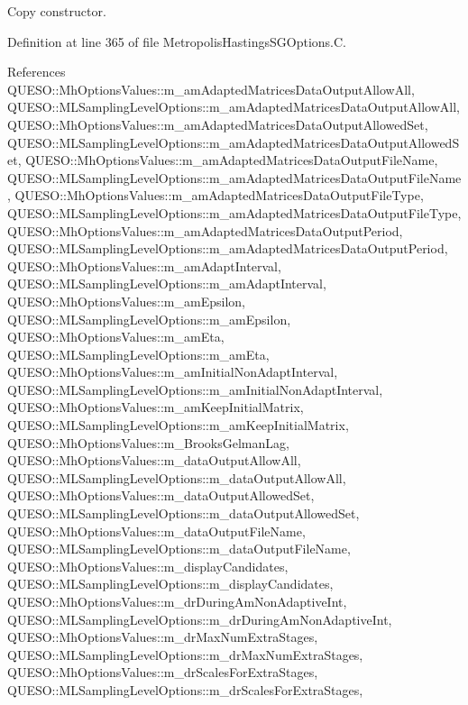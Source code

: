 Copy constructor. 



Definition at line 365 of file Metropolis\-Hastings\-S\-G\-Options.\-C.



References Q\-U\-E\-S\-O\-::\-Mh\-Options\-Values\-::m\-\_\-am\-Adapted\-Matrices\-Data\-Output\-Allow\-All, Q\-U\-E\-S\-O\-::\-M\-L\-Sampling\-Level\-Options\-::m\-\_\-am\-Adapted\-Matrices\-Data\-Output\-Allow\-All, Q\-U\-E\-S\-O\-::\-Mh\-Options\-Values\-::m\-\_\-am\-Adapted\-Matrices\-Data\-Output\-Allowed\-Set, Q\-U\-E\-S\-O\-::\-M\-L\-Sampling\-Level\-Options\-::m\-\_\-am\-Adapted\-Matrices\-Data\-Output\-Allowed\-Set, Q\-U\-E\-S\-O\-::\-Mh\-Options\-Values\-::m\-\_\-am\-Adapted\-Matrices\-Data\-Output\-File\-Name, Q\-U\-E\-S\-O\-::\-M\-L\-Sampling\-Level\-Options\-::m\-\_\-am\-Adapted\-Matrices\-Data\-Output\-File\-Name, Q\-U\-E\-S\-O\-::\-Mh\-Options\-Values\-::m\-\_\-am\-Adapted\-Matrices\-Data\-Output\-File\-Type, Q\-U\-E\-S\-O\-::\-M\-L\-Sampling\-Level\-Options\-::m\-\_\-am\-Adapted\-Matrices\-Data\-Output\-File\-Type, Q\-U\-E\-S\-O\-::\-Mh\-Options\-Values\-::m\-\_\-am\-Adapted\-Matrices\-Data\-Output\-Period, Q\-U\-E\-S\-O\-::\-M\-L\-Sampling\-Level\-Options\-::m\-\_\-am\-Adapted\-Matrices\-Data\-Output\-Period, Q\-U\-E\-S\-O\-::\-Mh\-Options\-Values\-::m\-\_\-am\-Adapt\-Interval, Q\-U\-E\-S\-O\-::\-M\-L\-Sampling\-Level\-Options\-::m\-\_\-am\-Adapt\-Interval, Q\-U\-E\-S\-O\-::\-Mh\-Options\-Values\-::m\-\_\-am\-Epsilon, Q\-U\-E\-S\-O\-::\-M\-L\-Sampling\-Level\-Options\-::m\-\_\-am\-Epsilon, Q\-U\-E\-S\-O\-::\-Mh\-Options\-Values\-::m\-\_\-am\-Eta, Q\-U\-E\-S\-O\-::\-M\-L\-Sampling\-Level\-Options\-::m\-\_\-am\-Eta, Q\-U\-E\-S\-O\-::\-Mh\-Options\-Values\-::m\-\_\-am\-Initial\-Non\-Adapt\-Interval, Q\-U\-E\-S\-O\-::\-M\-L\-Sampling\-Level\-Options\-::m\-\_\-am\-Initial\-Non\-Adapt\-Interval, Q\-U\-E\-S\-O\-::\-Mh\-Options\-Values\-::m\-\_\-am\-Keep\-Initial\-Matrix, Q\-U\-E\-S\-O\-::\-M\-L\-Sampling\-Level\-Options\-::m\-\_\-am\-Keep\-Initial\-Matrix, Q\-U\-E\-S\-O\-::\-Mh\-Options\-Values\-::m\-\_\-\-Brooks\-Gelman\-Lag, Q\-U\-E\-S\-O\-::\-Mh\-Options\-Values\-::m\-\_\-data\-Output\-Allow\-All, Q\-U\-E\-S\-O\-::\-M\-L\-Sampling\-Level\-Options\-::m\-\_\-data\-Output\-Allow\-All, Q\-U\-E\-S\-O\-::\-Mh\-Options\-Values\-::m\-\_\-data\-Output\-Allowed\-Set, Q\-U\-E\-S\-O\-::\-M\-L\-Sampling\-Level\-Options\-::m\-\_\-data\-Output\-Allowed\-Set, Q\-U\-E\-S\-O\-::\-Mh\-Options\-Values\-::m\-\_\-data\-Output\-File\-Name, Q\-U\-E\-S\-O\-::\-M\-L\-Sampling\-Level\-Options\-::m\-\_\-data\-Output\-File\-Name, Q\-U\-E\-S\-O\-::\-Mh\-Options\-Values\-::m\-\_\-display\-Candidates, Q\-U\-E\-S\-O\-::\-M\-L\-Sampling\-Level\-Options\-::m\-\_\-display\-Candidates, Q\-U\-E\-S\-O\-::\-Mh\-Options\-Values\-::m\-\_\-dr\-During\-Am\-Non\-Adaptive\-Int, Q\-U\-E\-S\-O\-::\-M\-L\-Sampling\-Level\-Options\-::m\-\_\-dr\-During\-Am\-Non\-Adaptive\-Int, Q\-U\-E\-S\-O\-::\-Mh\-Options\-Values\-::m\-\_\-dr\-Max\-Num\-Extra\-Stages, Q\-U\-E\-S\-O\-::\-M\-L\-Sampling\-Level\-Options\-::m\-\_\-dr\-Max\-Num\-Extra\-Stages, Q\-U\-E\-S\-O\-::\-Mh\-Options\-Values\-::m\-\_\-dr\-Scales\-For\-Extra\-Stages, Q\-U\-E\-S\-O\-::\-M\-L\-Sampling\-Level\-Options\-::m\-\_\-dr\-Scales\-For\-Extra\-Stages, 